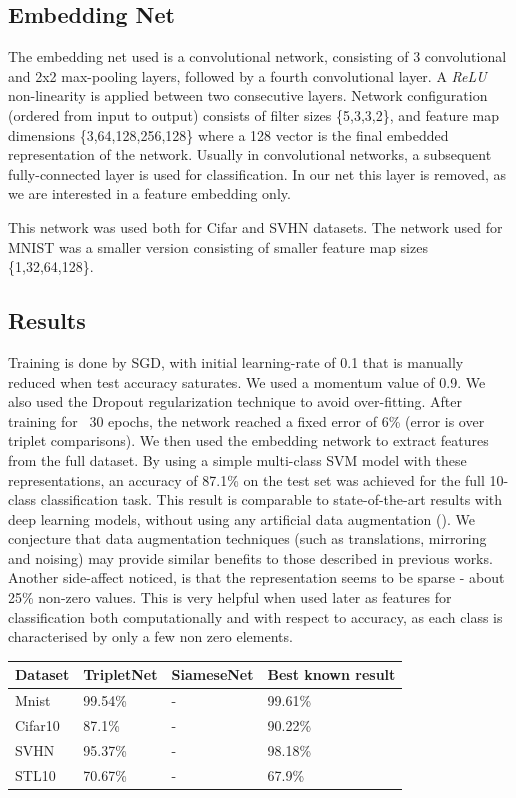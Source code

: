 \documentclass{article} %
\begin{document}
\subsection{Embedding Net}
The embedding net used is a convolutional network, consisting of 3 convolutional and 2x2 max-pooling layers, followed by a fourth convolutional layer. A \emph{ReLU} non-linearity is applied between two consecutive layers.
Network configuration (ordered from input to output) consists of filter sizes \{5,3,3,2\}, and feature map dimensions \{3,64,128,256,128\} where a 128 vector is the final embedded representation of the network. Usually in convolutional networks, a subsequent fully-connected
layer is used for classification. In our net this layer is removed, as we are interested in a feature embedding only.

This network was used both for Cifar and SVHN datasets. The network used for MNIST was a smaller version consisting of smaller feature map sizes \{1,32,64,128\}.



\subsection{Results}
Training is done by SGD, with initial learning-rate of 0.1 that is manually reduced when test accuracy saturates. We used a momentum value of 0.9. We also used the Dropout regularization technique to avoid over-fitting.
After training for ~30 epochs, the network reached a fixed error of 6\% (error is over triplet comparisons). We then used the embedding network to extract features from the full dataset. By using a simple multi-class SVM model with these representations, an accuracy of 87.1\% on the test set was achieved for the full 10-class classification task.
This result is comparable to state-of-the-art results with deep learning models, without using any artificial data augmentation (\citet{zeiler2013stochastic,goodfellow2013maxout,LinCY13}). We conjecture that data augmentation techniques (such as translations, mirroring and noising) may provide similar benefits to those described in previous works.\\
Another side-affect noticed, is that the representation seems to be sparse - about 25\% non-zero values. This is very helpful when used later as features for classification both computationally and with respect to accuracy, as each class is characterised by only a few non zero elements.
\begin{center}
    \begin{tabular}{ | l | l | l | p{5cm} |}
    \hline
    Dataset & TripletNet   & SiameseNet  & Best known result\\ \hline
    Mnist & 99.54\% & -& 99.61\% \citet{mairal2014convolutional,lee2014deeply}  \\ \hline
    Cifar10 & 87.1\% & - & 90.22\% \citet{lee2014deeply}  \\ \hline
    SVHN &  95.37\% & -& 98.18\% \citet{lee2014deeply} \\ \hline
    STL10& 70.67\%& - & 67.9\% \citet{lin2014stable}\\ \hline
    \end{tabular}
\end{center}
\end{document}
